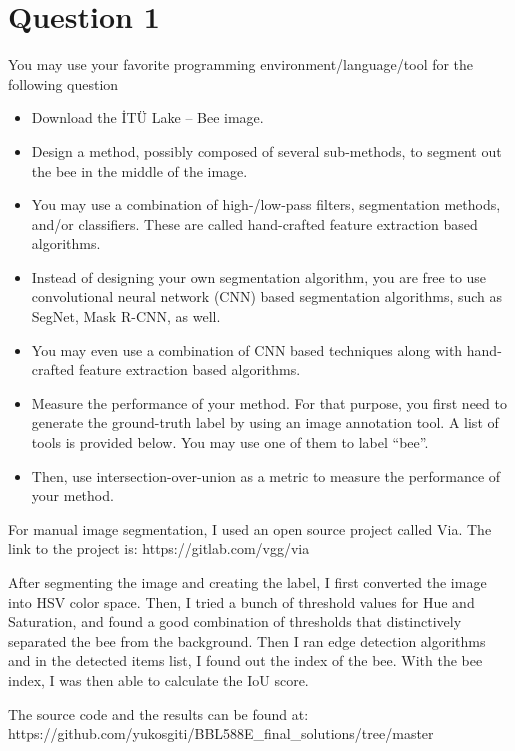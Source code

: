\documentclass[12pt]{article}
\begin{document}
\maketitle

\section{Question 1}\label{sec:q1}
You may use your favorite programming environment/language/tool for the following question
\begin{itemize}
    \item Download the İTÜ Lake – Bee image.
    \item Design a method, possibly composed of several sub-methods, to segment out the bee in the middle of the image.
    \item You may use a combination of high-/low-pass filters, segmentation methods, and/or classifiers. These are called hand-crafted feature extraction based algorithms.
    \item Instead of designing your own segmentation algorithm, you are free to use convolutional neural network (CNN) based segmentation algorithms, such as SegNet, Mask R-CNN, as well. 
    \item You may even use a combination of CNN based techniques along with hand-crafted feature extraction based algorithms. 
    \item Measure the performance of your method. For that purpose, you first need to generate the ground-truth label by using an image annotation tool. A list of tools is provided below. You may use one of them to label “bee”.  
    \item Then, use intersection-over-union as a metric to measure the performance of your method.
\end{itemize}

For manual image segmentation, I used an open source project called Via. The link to the project is: https://gitlab.com/vgg/via

After segmenting the image and creating the label, I first converted the image into HSV color space. Then, I tried a bunch of threshold values for Hue and Saturation, and found a good combination of thresholds that distinctively separated the bee from the background. Then I ran edge detection algorithms and in the detected items list, I found out the index of the bee. With the bee index, I was then able to calculate the IoU score.

The source code and the results can be found at:
https://github.com/yukosgiti/BBL588E_final_solutions/tree/master
\end{document}
